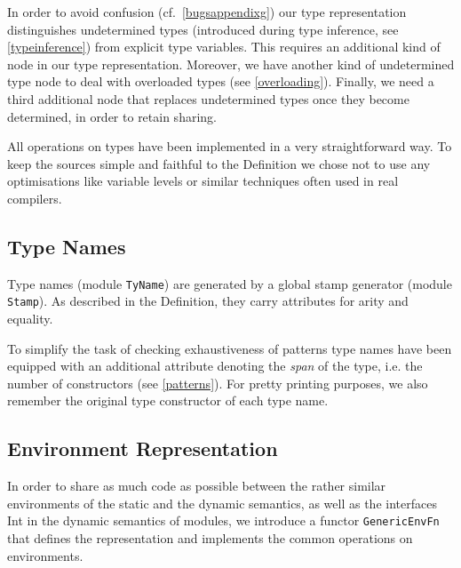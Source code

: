 \documentclass[twoside,titlepage]{article}
\newcommand{\void}[1]{}
\begin{document}
In order to avoid confusion (cf.\ \ref{bugsappendixg}) our type representation distinguishes undetermined types (introduced during type inference, see \ref{typeinference}) from explicit type variables. This requires an additional kind of node in our type representation. Moreover, we have another kind of undetermined type node to deal with overloaded types (see \ref{overloading}). Finally, we need a third additional node that replaces undetermined types once they become determined, in order to retain sharing.

All operations on types have been implemented in a very straightforward way. To keep the sources simple and faithful to the Definition we chose not to use any optimisations like variable levels or similar techniques often used in real compilers.


\subsection{Type Names}
\label{tynames}

Type names (module {\tt TyName}) are generated by a global stamp generator (module {\tt Stamp}). As described in the Definition, they carry attributes for arity and equality.

\void{
The equality attribute of type names is used in the Definition to determine whether a type admits equality. Those rules treat {\tt ref} in a special way. To generalise the treatment of {\tt ref} and allow for similar types like {\tt array} (which strictly speaking could not be added to SML without modifying the Definition), equality has not been implemented as a boolean attribute but via a tailor-made datatype allowing a third value of `special', {\tt ref}-like equality that is independent of particular argument types.
}

To simplify the task of checking exhaustiveness of patterns type names have been equipped with an additional attribute denoting the {\em span} of the type, i.e. the number of constructors (see \ref{patterns}). For pretty printing purposes, we also remember the original type constructor of each type name.


\subsection{Environment Representation}
\label{env}

In order to share as much code as possible between the rather similar environments of the static and the dynamic semantics, as well as the interfaces Int in the dynamic semantics of modules, we introduce a functor {\tt GenericEnvFn} that defines the representation and implements the common operations on environments.
\end{document}
